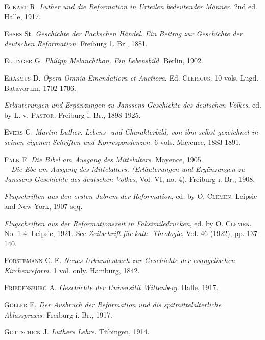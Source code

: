 \textsc{Eckart R.} \textit{Luther und die Reformation in Urteilen bedeutender Männer.}
2nd ed. Halle, 1917.

\textsc{Ehses} St. \textit{Geschichte der Packschen Händel. Ein Beitrag zur Geschichte der
deutschen Reformation.} Freiburg 1. Br., 1881.

\textsc{Ellinger G.} \textit{Philipp Melanchthon. Ein Lebensbild.} Berlin, 1902.

\textsc{Erasmus D.} \textit{Opera Omnia Emendatiora et Auctiora}. Ed. \textsc{Clericus}. 10
vols. Lugd. Batavorum, 1702-1706.

\textit{Erläuterungen und Ergänzungen zu Janssens Geschichte des deutschen Volkes},
ed. by L. v. \textsc{Pastor.} Freiburg i. Br., 1898-1925.

\textsc{Evers G.} \textit{Martin Luther. Lebens- und Charakterbild, von ibm selbst gezeichnet
in seinen eigenen Schriften und Korrespondenzen.} 6 vols. Mayence,
1883-1891.

\textsc{Falk F.} \textit{Die Bibel am Ausgang des Mittelalters}. Mayence, 1905. \\
---\textit{Die Ebe am Ausgang des Mittelalters. (Erläuterungen und Ergänzungen
zu Janssens Geschichte des deutschen Volkes}, Vol. VI, no. 4).
Freiburg ı. Br., 1908.

\textit{Flugschriften aus den ersten Jabrem der Reformation}, ed. by \textsc{O. Clemen.}
Leipsic and New York, 1907 sqq.

\textit{Flugschriften aus der Reformationszeit in Faksimiledrucken}, ed. by \textsc{O.
Clemen.} No. 1-4. Leipsic, 1921. See \textit{Zeitschrift für kath. Theologie}, Vol.
46 (1922), pp. 137-140.

\textsc{Förstemann C. E.} \textit{Neues Urkundenbuch zur Geschichte der evangelischen
Kirchenreform}. 1 vol. only. Hamburg, 1842.

\textsc{Friedensburg A.} \textit{Geschichte der Universitit Wittenberg.} Halle, 1917.

\textsc{Göller E.} \textit{Der Ausbruch der Reformation und dis spitmittelalterliche
Ablasspraxis.} Freiburg i. Br., 1917.

\textsc{Gottschick J.} \textit{Luthers Lehre.} Tübingen, 1914.

